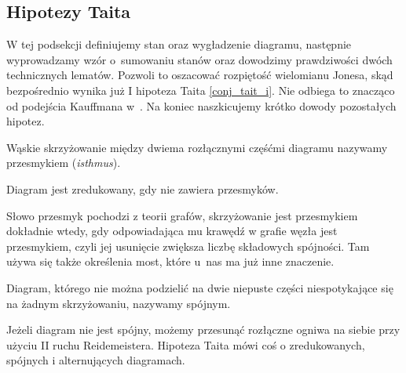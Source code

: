 \subsection{Hipotezy Taita} %
\label{sub:span}
W tej podsekcji definiujemy stan oraz wygładzenie diagramu, następnie wyprowadzamy wzór o~sumowaniu stanów oraz dowodzimy prawdziwości dwóch technicznych lematów.
Pozwoli to oszacować rozpiętość wielomianu Jonesa, skąd bezpośrednio wynika już I hipoteza Taita \ref{conj_tait_i}.
Nie odbiega to znacząco od podejścia Kauffmana w~\cite{kauffman87}.
Na koniec naszkicujemy krótko dowody pozostałych hipotez.

\begin{definition}
    \label{def:isthmus}
    Wąskie skrzyżowanie między dwiema rozłącznymi częśćmi diagramu nazywamy przesmykiem (\emph{isthmus}).
\begin{comment}
    \[
        \begin{tikzpicture}[baseline=-0.65ex,scale=0.07]
        \begin{knot}[clip width=5]
            \strand[semithick] (-5,-5) rectangle (5,5);
            \strand[semithick] (-5, -3) [in=right, out=left] to (-15, 3);
            \strand[semithick] (-5, 3) [in=right, out=left] to (-15, -3);

            \node at (-20, -3) {$\ldots$};
            \node at (-20,  3) {$\ldots$};
        \end{knot}
        \end{tikzpicture}
    \]
\end{comment}
    Diagram jest zredukowany, gdy nie zawiera przesmyków.
\end{definition}

Słowo przesmyk pochodzi z teorii grafów, skrzyżowanie jest przesmykiem dokładnie wtedy, gdy odpowiadająca mu krawędź w grafie węzła jest przesmykiem, czyli jej usunięcie zwiększa liczbę składowych spójności.
Tam używa się także określenia most, które u~nas ma już inne znaczenie.

\begin{definition}[spójny]
    \label{diagram!spójny}
    Diagram, którego nie można podzielić na dwie niepuste części niespotykające się na żadnym skrzyżowaniu, nazywamy spójnym.
\end{definition}

Jeżeli diagram nie jest spójny, możemy przesunąć rozłączne ogniwa na siebie przy użyciu II ruchu Reidemeistera.
Hipoteza Taita mówi coś o zredukowanych, spójnych i alternujących diagramach.

